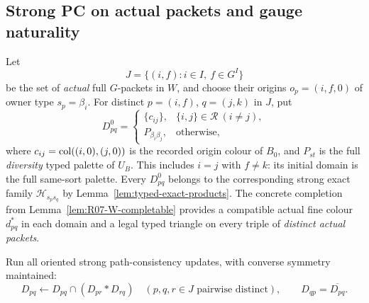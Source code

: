 \subsection{Strong PC on actual packets and gauge naturality}
\label{subsec:R07-PC}

Let
\[
 J=\{(i,f):i\in I,\ f\in G^I\}
\]
be the set of \emph{actual} full $G$-packets in $W$, and choose
their origins $o_p=(i,f,0)$ of owner type $s_p=\beta_i$.
For distinct $p=(i,f)$, $q=(j,k)$ in $J$, put
\begin{equation}\label{eq:R07-initial-domain}
 D^0_{pq}=\begin{cases}
   \{c_{ij}\},&\{i,j\}\in\mathcal R\ (i\ne j),\\
   P_{\beta_i\beta_j},&\text{otherwise},
 \end{cases}
\end{equation}
where $c_{ij}=\operatorname{col}((i,0),(j,0))$ is the recorded origin
colour of $B_0$, and $P_{st}$ is the full \emph{diversity}
typed palette of $U_B$.  This includes $i=j$ with $f\ne k$:
its initial domain is the full same-sort palette.
Every $D^0_{pq}$ belongs to the corresponding strong exact family
$\mathcal H_{s_ps_q}$ by
Lemma~\ref{lem:typed-exact-products}.  The concrete completion
from Lemma~\ref{lem:R07-W-completable} provides a compatible
actual fine colour $d^*_{pq}$ in each domain and a legal typed
triangle on every triple of \emph{distinct actual packets}.

Run all oriented strong path-consistency updates, with converse
symmetry maintained:
\begin{equation}\label{eq:R07-PC}
 D_{pq}\longleftarrow D_{pq}\cap(D_{pr}*D_{rq})
 \quad(p,q,r\in J\text{ pairwise distinct}),
 \qquad D_{qp}=\overline{D_{pq}}.
\end{equation}

